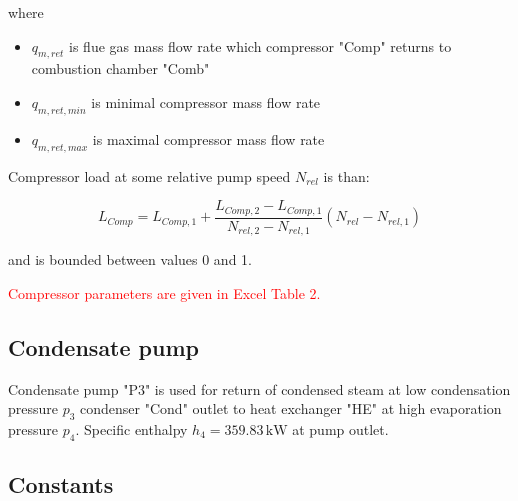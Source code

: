 \documentclass{article}
\begin{document}
	\noindent
	where
	
	\begin{itemize}
		\item $q_{m,ret}$ is flue gas mass flow rate which compressor "Comp" 
		returns to combustion chamber "Comb"
		\item $q_{m,ret,min}$ is minimal compressor mass flow rate
		\item $q_{m,ret,max}$ is maximal compressor mass flow rate	
	\end{itemize}

	\noindent
	Compressor load at some relative pump speed $N_{rel}$ is than:
	
	\begin{equation}\label{eq:compressor_load_rel}
		L_{Comp} = L_{Comp,1} + \frac{L_{Comp,2} - L_{Comp,1}}{N_{rel,2} - N_{rel,1}} \left( N_{rel} - N_{rel,1}\right)
	\end{equation}
	
	\noindent
	and is bounded between values 0 and 1.
	
	\noindent
	\textcolor{red}{Compressor parameters are given in Excel Table 2.}
	
	\subsection{Condensate pump}

	Condensate pump "P3" is used for return of condensed steam at low 
	condensation pressure $p_3$ condenser "Cond" outlet to heat exchanger "HE" 
	at high evaporation pressure $p_4$.
	Specific enthalpy $h_4 = 359.83 \,\textrm{kW}$ at pump outlet.

	\subsection{Constants}
	
\end{document}
